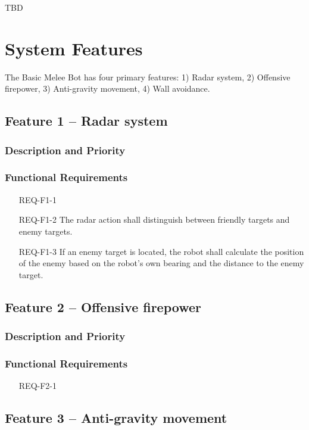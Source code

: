 \documentclass{scrreprt}
\begin{document}
TBD

\chapter{System Features}
The Basic Melee Bot has four primary features: 1) Radar system, 2) Offensive firepower, 3) Anti-gravity movement, 4) Wall avoidance.

\section{Feature 1 -- Radar system}

\subsection{Description and Priority}

\subsection{Functional Requirements}
\begin{itemize}
\item[REQ-F1-1] 
\item[REQ-F1-2] The radar action shall distinguish between friendly targets and enemy targets.
\item[REQ-F1-3] If an enemy target is located, the robot shall calculate the position of the enemy based on the robot's own bearing and the distance to the enemy target. 
\end{itemize}

\section{Feature 2 -- Offensive firepower}

\subsection{Description and Priority}

\subsection{Functional Requirements}
\begin{itemize}
\item[REQ-F2-1]
\end{itemize}

\section{Feature 3 -- Anti-gravity movement}
	
\end{document}
